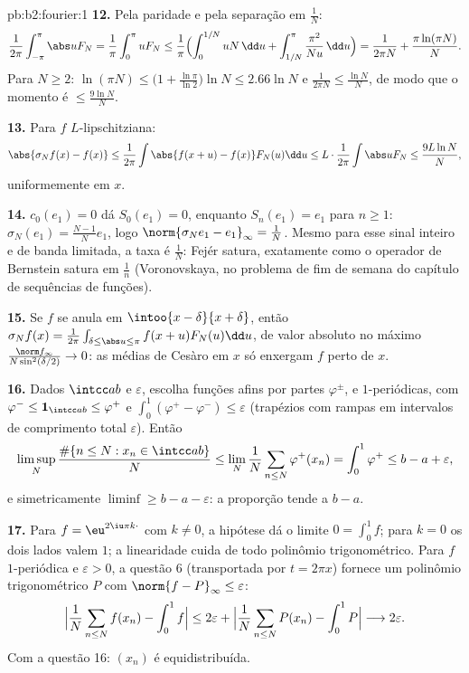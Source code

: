 \begin{solution}{pb:b2:fourier:1}
\textbf{12.} Pela paridade e pela separação em $\frac1N$:
\[
\frac{1}{2\pi}\int_{-\pi}^{\pi}\abs uF_N
= \frac1\pi\int_0^\pi uF_N
\leq \frac1\pi\Bigl(\int_0^{1/N}uN\,\dd u +
\int_{1/N}^{\pi}\frac{\pi^2}{Nu}\,\dd u\Bigr)
= \frac{1}{2\pi N} + \frac{\pi\ln(\pi N)}{N} .
\]
Para $N \geq 2$: $\ln(\pi N) \leq \bigl(1 +
\frac{\ln\pi}{\ln2}\bigr)\ln N \leq 2.66\ln N$ e
$\frac{1}{2\pi N} \leq \frac{\ln N}{N}$, de modo que o momento é
$\leq \frac{9\ln N}{N}$.

\textbf{13.} Para $f$ $L$-lipschitziana:
\[
\abs{\sigma_Nf(x) - f(x)}
\leq \frac{1}{2\pi}\int\abs{f(x+u) - f(x)}F_N(u)\dd u
\leq L\cdot\frac{1}{2\pi}\int\abs uF_N
\leq \frac{9L\ln N}{N},
\]
uniformemente em $x$.

\textbf{14.} $c_0(e_1) = 0$ dá $S_0(e_1) = 0$, enquanto
$S_n(e_1) = e_1$ para $n \geq 1$: $\sigma_N(e_1) =
\frac{N-1}{N}e_1$, logo $\norm{\sigma_Ne_1 - e_1}_\infty =
\frac1N$. Mesmo para esse sinal inteiro e de banda limitada, a taxa é
$\frac1N$: Fejér satura, exatamente como o operador de Bernstein
satura em $\frac1n$ (Voronovskaya, no problema de fim de semana
do capítulo de sequências de funções).

\textbf{15.} Se $f$ se anula em $\intoo{x-\delta}{x+\delta}$,
então $\sigma_Nf(x) = \frac{1}{2\pi}\int_{\delta \leq \abs u
\leq \pi}f(x+u)F_N(u)\dd u$, de valor absoluto no máximo
$\frac{\norm f_\infty}{N\sin^2(\delta/2)} \to 0$: as médias de Cesàro
em $x$ só enxergam $f$ perto de $x$.

\textbf{16.} Dados $\intcc ab$ e $\varepsilon$, escolha funções
afins por partes $\varphi^\pm$,  e $1$-periódicas, com
$\varphi^- \leq \mathbf 1_{\intcc ab} \leq \varphi^+$ e
$\int_0^1(\varphi^+ - \varphi^-) \leq \varepsilon$ (trapézios
com rampas em intervalos de comprimento total $\varepsilon$).
Então
\[
\limsup_N\frac{\#\{n \leq N : x_n \in \intcc ab\}}{N}
\leq \lim_N\frac1N\sum_{n\leq N}\varphi^+(x_n)
= \int_0^1\varphi^+ \leq b - a + \varepsilon ,
\]
e simetricamente $\liminf \geq b - a - \varepsilon$: a
proporção tende a $b - a$.

\textbf{17.} Para $f = \eu^{2\iu\pi k\cdot}$ com $k \neq 0$, a
hipótese dá o limite $0 = \int_0^1f$; para $k = 0$ os dois
lados valem $1$; a linearidade cuida de todo polinômio
trigonométrico. Para $f$  $1$-periódica e $\varepsilon >
0$, a questão 6 (transportada por $t = 2\pi x$) fornece um
polinômio trigonométrico $P$ com $\norm{f - P}_\infty \leq
\varepsilon$:
\[
\Bigl|\frac1N\sum_{n\leq N}f(x_n) - \int_0^1f\Bigr|
\leq 2\varepsilon +
\Bigl|\frac1N\sum_{n\leq N}P(x_n) - \int_0^1P\Bigr|
\longrightarrow 2\varepsilon .
\]
Com a questão 16: $(x_n)$ é equidistribuída.


\end{solution}
